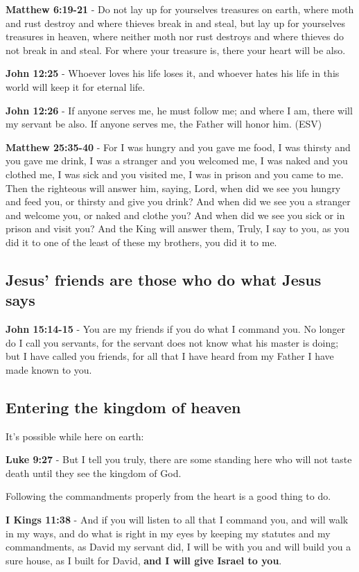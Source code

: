 \documentclass[11pt]{article}
\begin{document}
\textbf{Matthew 6:19-21} - Do not lay up for yourselves treasures on earth, where moth and rust destroy and where thieves break in and steal, but lay up for yourselves treasures in heaven, where neither moth nor rust destroys and where thieves do not break in and steal. For where your treasure is, there your heart will be also.

\textbf{John 12:25} - Whoever loves his life loses it, and whoever hates his life in this world will keep it for eternal life.

\textbf{John 12:26} - If anyone serves me, he must follow me; and where I am, there will my servant be also. If anyone serves me, the Father will honor him. (ESV)

\textbf{Matthew 25:35-40} - For I was hungry and you gave me food, I was thirsty and you gave me drink, I was a stranger and you welcomed me, I was naked and you clothed me, I was sick and you visited me, I was in prison and you came to me. Then the righteous will answer him, saying, Lord, when did we see you hungry and feed you, or thirsty and give you drink? And when did we see you a stranger and welcome you, or naked and clothe you? And when did we see you sick or in prison and visit you? And the King will answer them, Truly, I say to you, as you did it to one of the least of these my brothers, you did it to me.

\subsection{Jesus' friends are those who do what Jesus says}
\label{sec:orgb9c705d}
\textbf{John 15:14-15} - You are my friends if you do what I command you. No longer do I call you servants, for the servant does not know what his master is doing; but I have called you friends, for all that I have heard from my Father I have made known to you.

\subsection{Entering the kingdom of heaven}
\label{sec:org480bb2a}
It's possible while here on earth:

\textbf{Luke 9:27} - But I tell you truly, there are some standing here who will not taste death until they see the kingdom of God.

Following the commandments properly from the heart is a good thing to do.

\textbf{I Kings 11:38} - And if you will listen to all that I command you, and will walk in my ways, and do what is right in my eyes by keeping my statutes and my commandments, as David my servant did, I will be with you and will build you a sure house, as I built for David, \textbf{and I will give Israel to you}.
\end{document}
